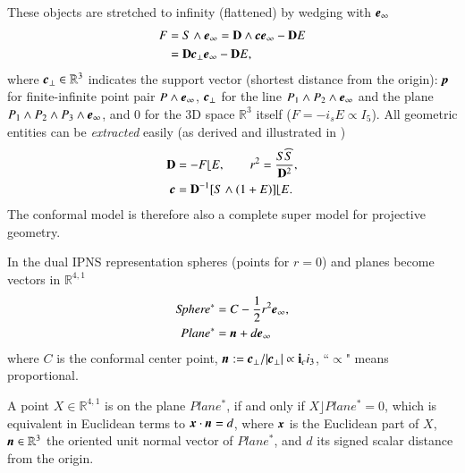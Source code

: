 \documentclass[cameraready]{jcmsi}%
\newcommand{\R}{\mathbb{R}}
\newcommand{\gvec}[1]{\ensuremath{\mbox{\textbf{\textit{#1}}}}}
\begin{document}
These objects are stretched to infinity (flattened) by wedging with $\gvec{e}_{\infty}$
\begin{align} 
  F &= S\wedge \gvec{e}_{\infty}
  = \mathbf{D}\wedge \gvec{c}\gvec{e}_{\infty}-\mathbf{D}E
  \nonumber \\
  &= \mathbf{D}\gvec{c}_{\perp}\gvec{e}_{\infty}-\mathbf{D}E,
\end{align}
where $\gvec{c}_{\perp}\in\R^3$ indicates the support vector (shortest distance from the origin): $\gvec{p}$ for finite-infinite point pair $P\wedge \gvec{e}_{\infty}$,
$\gvec{c}_{\perp}$ for the line $P_1 \wedge P_2\wedge \gvec{e}_{\infty}$ and the plane
$P_1 \wedge P_2\wedge P_3 \wedge \gvec{e}_{\infty}$, and $0$ for the 3D space $\R^3$ itself ($F=-i_sE\propto I_5$). All geometric entities can be \textit{extracted} easily (as derived and illustrated in \cite{HTBY:Carrier})
\begin{align} 
  \mathbf{D} &= -F\lfloor E, \qquad
  r^2 = \frac{S\widehat{S}}{\mathbf{D}^2}, 
  \nonumber \\
  \gvec{c} &= \mathbf{D}^{-1}[S\wedge(1+E)]\lfloor E . 
\end{align}
The conformal model is therefore also a complete super model for projective geometry. 

In the dual IPNS representation spheres (points for $r=0$) and planes become vectors in $\R^{4,1}$
\begin{align}
  \textit{Sphere}^* &= C - \frac{1}{2}r^2\gvec{e}_{\infty}, 
  \nonumber \\
  Plane^* &= \gvec{n}+d\gvec{e}_{\infty}
\end{align}
where $C$ is the conformal center point, $\gvec{n}:=\gvec{c}_{\perp}/|\gvec{c}_{\perp}|\propto \mathbf{i}_ci_3$, ``$\propto$" means proportional.

A point $X \in \R^{4,1}$ is on the plane $Plane^*$, if and only if  $X\rfloor Plane^*=0$, which is equivalent in Euclidean terms to $\gvec{x} \cdot \gvec{n} = d$, where $\gvec{x}$ is the Euclidean part of $X$, $\gvec{n} \in \R^3$ the oriented unit normal vector of $Plane^*$, and $d$ its signed scalar distance from the origin. 
\end{document}
